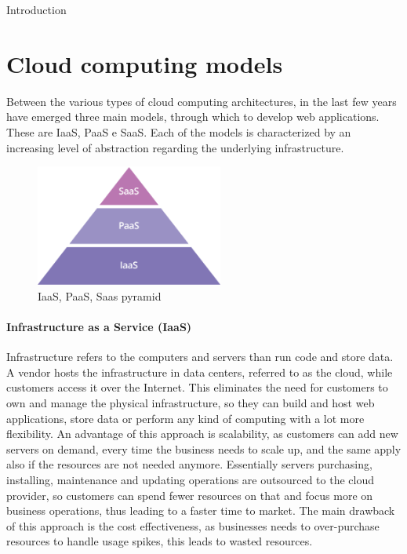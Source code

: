 \begin{chapter}{Introduction}
    \label{chap:intro}

    \section{Cloud computing models}
    Between the various types of cloud computing architectures, in the last few years have
    emerged three main models, through which to develop web applications. These are IaaS,
    PaaS e SaaS.
    Each of the models is characterized by an increasing level of abstraction regarding
    the underlying infrastructure.

    \begin{figure}
        \centering
        \includegraphics[height=4cm]{source/images/saas-paas-iaas-cloud-pyramid.png}
        \caption{IaaS, PaaS, Saas pyramid}
        \label{fig:cloud_computing_pyramid}
    \end{figure}

    \paragraph{Infrastructure as a Service (IaaS)}
    Infrastructure refers to the computers and servers than run code and store data. A
    vendor hosts the infrastructure in data centers, referred to as the cloud, while
    customers access it over the Internet. This eliminates the need for customers to own
    and manage the physical infrastructure, so they can build and host web applications,
    store data or perform any kind of computing with a lot more flexibility.
    An advantage of this approach is scalability, as customers can add new servers on demand,
    every time the business needs to scale up, and the same apply also if the resources are
    not needed anymore. Essentially servers purchasing, installing, maintenance and updating
    operations are outsourced to the cloud provider, so customers can spend fewer resources
    on that and focus more on business operations, thus leading to a faster time to market.
    The main drawback of this approach is the cost effectiveness, as businesses needs to
    over-purchase resources to handle usage spikes, this leads to wasted resources.


\end{chapter}

